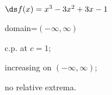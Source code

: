 {$\ds f(x) =x^3-3x^2+3x-1$
}
{domain=$(-\infty,\infty)$

c.p. at $c=1$; 

increasing on $(-\infty,\infty)$;

no relative extrema.
}

